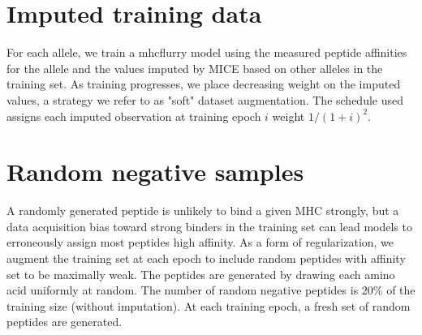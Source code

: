 \section{Imputed training data}
For each allele, we train a mhcflurry model using the measured peptide affinities for the allele and the values imputed by MICE based on other alleles in the training set. As training progresses, we place decreasing weight on the imputed values, a strategy we refer to as "soft" dataset augmentation. The schedule used assigns each imputed observation at training epoch $i$ weight $1 / (1 + i)^2$.

\section{Random negative samples}
A randomly generated peptide is unlikely to bind a given MHC strongly, but a data acquisition bias toward strong binders in the training set can lead models to erroneously assign most peptides high affinity. As a form of regularization, we augment the training set at each epoch to include random peptides with affinity set to be maximally weak. The peptides are generated by drawing each amino acid uniformly at random. The number of random negative peptides is 20\% of the training size (without imputation). At each training epoch, a fresh set of random peptides are generated.

